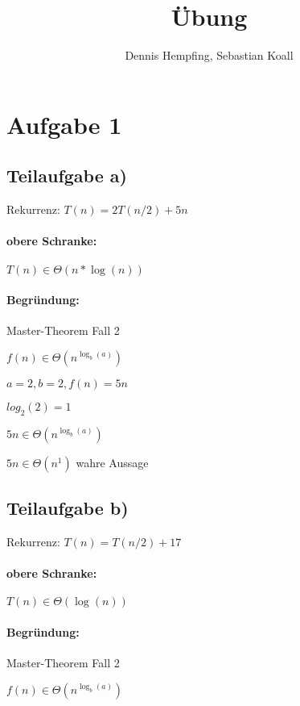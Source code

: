 \documentclass[12pt]{scrartcl}%
\theoremstyle{nonumberplain}
\newcommand{\bT}[1]{\Theta (#1)}
\begin{document}
\author{Dennis Hempfing, Sebastian Koall}
\title{Übung}
\date{} 
\pagestyle{myheadings}

\maketitle %

\section*{Aufgabe 1}

\subsection*{Teilaufgabe a)}
Rekurrenz: $ T(n) = 2T(n/2) + 5n $

\paragraph{obere Schranke:} $ T(n) \in \bT{n*\log(n)} $

\paragraph{Begründung:} Master-Theorem Fall 2

$f(n) \in \bT{n^{\log_b (a)}}$

$a=2, b=2, f(n)=5n$

$log_2 (2) = 1$

$5n \in \bT{n^{\log_b (a)}}$

$5n \in \bT{n^1}$ wahre Aussage

\newpage

\subsection*{Teilaufgabe b)}
Rekurrenz: $ T(n) = T(n/2) + 17 $

\paragraph{obere Schranke:} $ T(n) \in \bT{\log(n)} $

\paragraph{Begründung:} Master-Theorem Fall 2

$f(n) \in \bT{n^{\log_b (a)}}$
\end{document}
